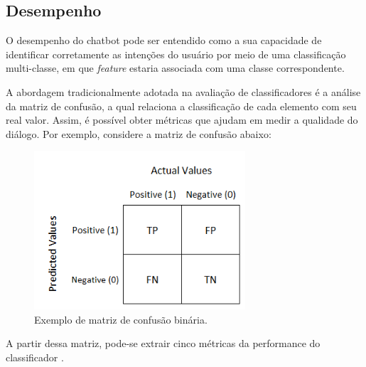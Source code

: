 \documentclass[]{politex}
\begin{document}
\subsection{Desempenho}

O desempenho do chatbot pode ser entendido como a sua capacidade de identificar corretamente as intenções do usuário por meio de uma classificação multi-classe, em que \textit{feature} estaria associada com uma classe correspondente. 

A abordagem tradicionalmente adotada na avaliação de classificadores é a análise da matriz de confusão, a qual relaciona a classificação de cada elemento com seu real valor. Assim, é possível obter métricas que ajudam em medir a qualidade do diálogo. Por exemplo, considere a matriz de confusão abaixo:

\begin{figure}[h]
    \centering
    \includegraphics[width=0.7\textwidth]{images/confusion-matrix.png}
    \caption{Exemplo de matriz de confusão binária.}
    \label{fig:project_roadmap}
\end{figure}

A partir dessa matriz, pode-se extrair cinco métricas da performance do classificador \cite{Hossin-Sulaiman-2015}.
\end{document}
